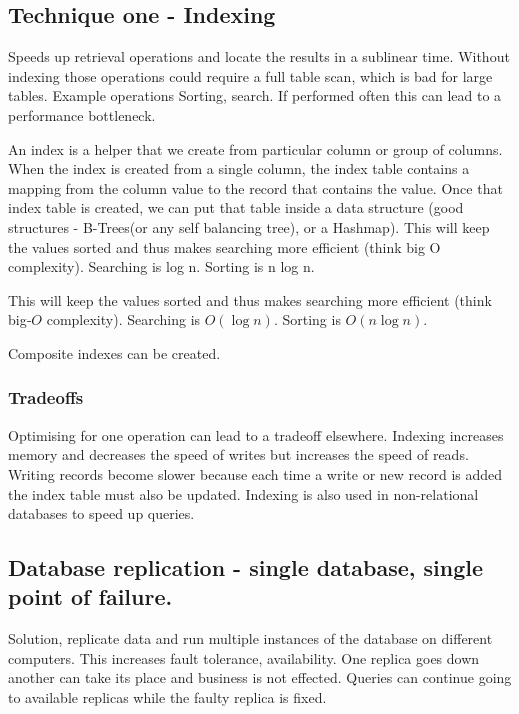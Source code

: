 \documentclass[a4paper, 11pt]{book}
\begin{document}
    \subsection{Technique one - Indexing}
    Speeds up retrieval operations and locate the results in a sublinear time.
    Without indexing those operations could require a full table scan, which is bad for large tables.
    Example operations
    Sorting, search.
    If performed often this can lead to a performance bottleneck.

    An index is a helper that we create from particular column or group of columns.
    When the index is created from a single column, the index table contains a mapping from the column value to the record that contains the value.
    Once that index table is created, we can put that table inside a data structure (good structures - B-Trees(or any self balancing tree), or a Hashmap).
    This will keep the values sorted and thus makes searching more efficient (think big O complexity).
    Searching is log n.
    Sorting is n log n.

    This will keep the values sorted and thus makes searching more efficient (think big‑$O$ complexity).
    Searching is $O(\log n)$.
    Sorting is $O(n \log n)$.

    Composite indexes can be created.


    \subsubsection{Tradeoffs}
    Optimising for one operation can lead to a tradeoff elsewhere.
    Indexing increases memory and decreases the speed of writes but increases the speed of reads.
    Writing records become slower because each time a write or new record is added the index table must also be updated.
    Indexing is also used in non-relational databases to speed up queries.

    \subsection{Database replication - single database, single point of failure.}
    Solution, replicate data and run multiple instances of the database on different computers.
    This increases fault tolerance, availability.
    One replica goes down another can take its place and business is not effected.
    Queries can continue going to available replicas while the faulty replica is fixed.
\end{document}
